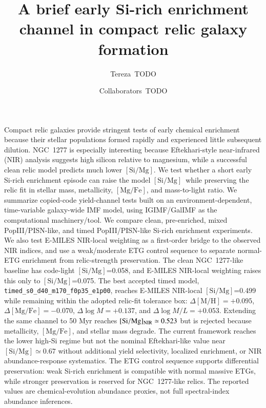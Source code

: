 \documentclass{aa}
\newcommand{\simg}{\ensuremath{[\mathrm{Si}/\mathrm{Mg}]}}
\newcommand{\mgfe}{\ensuremath{[\mathrm{Mg}/\mathrm{Fe}]}}
\newcommand{\mh}{\ensuremath{[\mathrm{M}/\mathrm{H}]}}
\begin{document}
\title{A brief early Si-rich enrichment channel in compact relic galaxy formation}

\author{Tereza~TODO
\and Collaborators~TODO}


\abstract
{Compact relic galaxies provide stringent tests of early chemical enrichment because their stellar populations formed rapidly and experienced little subsequent dilution. NGC~1277 is especially interesting because Eftekhari-style near-infrared (NIR) analysis suggests high silicon relative to magnesium, while a successful clean relic model predicts much lower \simg.}
{We test whether a short early Si-rich enrichment episode can raise the model \simg\ while preserving the relic fit in stellar mass, metallicity, \mgfe, and mass-to-light ratio.}
{We summarize copied-code yield-channel tests built on an environment-dependent, time-variable galaxy-wide IMF model, using IGIMF/GalIMF as the computational machinery/tool. We compare clean, pre-enriched, mixed PopIII/PISN-like, and timed PopIII/PISN-like Si-rich enrichment experiments. We also test E-MILES NIR-local weighting as a first-order bridge to the observed NIR indices, and use a weak/moderate ETG control sequence to separate normal-ETG enrichment from relic-strength preservation.}
{The clean NGC~1277-like baseline has code-light \simg=0.058, and E-MILES NIR-local weighting raises this only to \simg=0.075. The best accepted timed model, \texttt{timed\_s0\_d40\_m170\_f0p35\_e1p00}, reaches E-MILES NIR-local \simg=0.499 while remaining within the adopted relic-fit tolerance box: $\Delta\mh=+0.095$, $\Delta\mgfe=-0.070$, $\Delta\log M=+0.137$, and $\Delta\log M/L=+0.053$. Extending the same channel to 50 Myr reaches $\simg_{\rm NIR}\simeq0.523$ but is rejected because metallicity, \mgfe, and stellar mass degrade.}
{The current framework reaches the lower high-Si regime but not the nominal Eftekhari-like value near $\simg\simeq0.67$ without additional yield selectivity, localized enrichment, or NIR abundance-response systematics. The ETG control sequence supports differential preservation: weak Si-rich enrichment is compatible with normal massive ETGs, while stronger preservation is reserved for NGC~1277-like relics. The reported values are chemical-evolution abundance proxies, not full spectral-index abundance inferences.}


\maketitle












\end{document}
